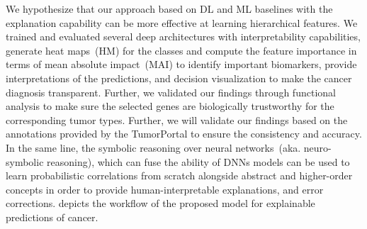 \hspace*{3.5mm} We hypothesize that our approach based on DL and ML baselines with the explanation capability can be more effective at learning hierarchical features. We trained and evaluated several deep architectures with interpretability capabilities, generate heat maps~(HM) for the classes and compute the feature importance in terms of mean absolute impact~(MAI) to identify important biomarkers, provide interpretations of the predictions, and decision visualization to make the cancer diagnosis transparent. Further, we validated our findings through functional analysis to make sure the selected genes are biologically trustworthy for the corresponding tumor types. Further, we will validate our findings based on the annotations provided by the TumorPortal to ensure the consistency and accuracy. In the same line, the symbolic reasoning over neural networks~(aka. neuro-symbolic reasoning), which can fuse the ability of DNNs models can be used to learn probabilistic correlations from scratch alongside abstract and higher-order concepts in order to provide human-interpretable explanations, and error corrections.  depicts the workflow of the proposed model for explainable predictions of cancer. 


